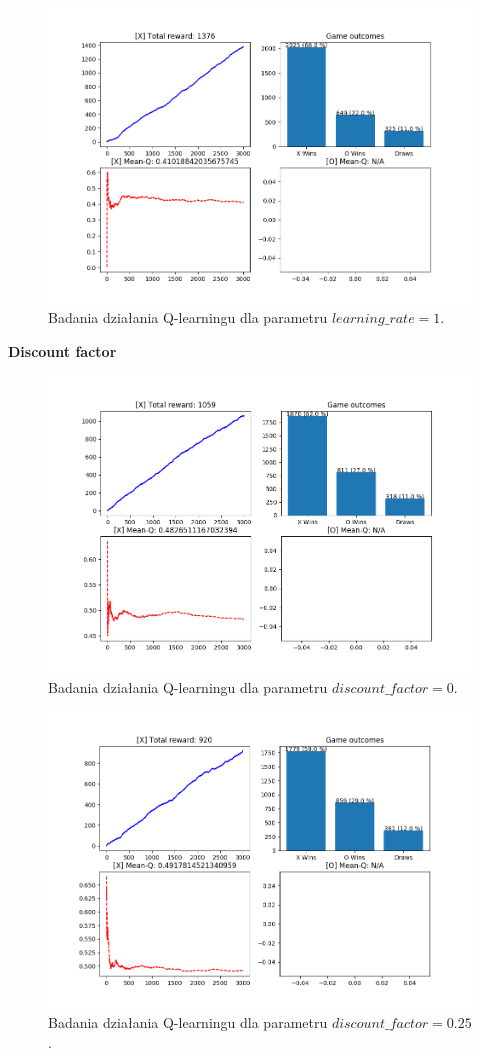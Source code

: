 \begin{figure}[H]
	\centering
	\includegraphics[width=0.7\linewidth]{imgs/q_learning/analysis/no_batch/lr/lr_1}
	\caption{Badania działania Q-learningu dla parametru $learning\_rate = 1$.}
\end{figure}

\pagebreak

\textbf{Discount factor}
\begin{figure}[H]
	\centering
	\includegraphics[width=0.7\linewidth]{imgs/q_learning/analysis/no_batch/df/df_0}
	\caption{Badania działania Q-learningu dla parametru $discount\_factor = 0$.}
\end{figure}

\begin{figure}[H]
	\centering
	\includegraphics[width=0.7\linewidth]{imgs/q_learning/analysis/no_batch/df/df_025}
	\caption{Badania działania Q-learningu dla parametru $discount\_factor = 0.25$.}
\end{figure}

